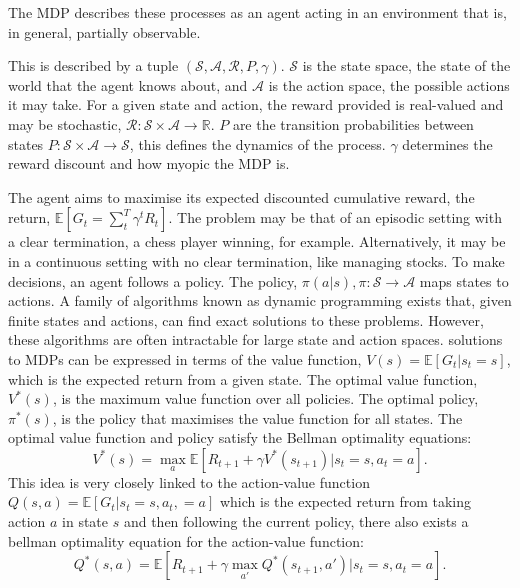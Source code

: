 The MDP describes these processes as an agent acting in an environment that is, in general, partially observable.

This is described by a tuple $(\mathcal{S}, \mathcal{A}, \mathcal{R}, P, \gamma)$. $\mathcal{S}$ is the state space, the state of the world that the agent knows about, and $\mathcal{A}$ is the action space, the possible actions it may take. For a given state and action, the reward provided is real-valued and may be stochastic, $\mathcal{R}: \mathcal{S} \times \mathcal{A} \rightarrow \mathbb{R}$. $P$ are the transition probabilities between states $P: \mathcal{S} \times \mathcal{A} \rightarrow \mathcal{S}$, this defines the dynamics of the process. $\gamma $ determines the reward discount and how myopic the MDP is.

The agent aims to maximise its expected discounted cumulative reward, the return, $ \mathbb{E} [ G_t = \sum_t^T \gamma^t R_t ] $. The problem may be that of an episodic setting with a clear termination, a chess player winning, for example. Alternatively, it may be in a continuous setting with no clear termination, like managing stocks. To make decisions, an agent follows a policy. The policy, $\pi(a|s), \pi: \mathcal{S} \rightarrow \mathcal{A}$ maps states to actions.
A family of algorithms known as dynamic programming exists that, given finite states and actions, can find exact solutions to these problems. However, these algorithms are often intractable for large state and action spaces.
solutions to MDPs can be expressed in terms of the value function, $V(s) = \mathbb{E} [ G_t | s_t = s]$, which is the expected return from a given state. The optimal value function, $V^*(s)$, is the maximum value function over all policies. The optimal policy, $\pi^*(s)$, is the policy that maximises the value function for all states. The optimal value function and policy satisfy the Bellman optimality equations\cite{bellamn1957mdp}:
\begin{equation}
	V^*(s) = \max_a \mathbb{E} [ R_{t+1} + \gamma V^*(s_{t+1}) | s_t = s, a_t = a].
\end{equation}
This idea is very closely linked to the action-value function $Q(s, a) = \mathbb{E} [G_t | s_t=s, a_t,=a]$ which is the expected return from taking action $a$ in state $s$ and then following the current policy, there also exists a bellman optimality equation for the action-value function:
\begin{equation}
	Q^*(s,a) = \mathbb{E} [ R_{t+1} + \gamma \max_{a'} Q^*(s_{t+1}, a') | s_t = s, a_t = a].
\end{equation}

